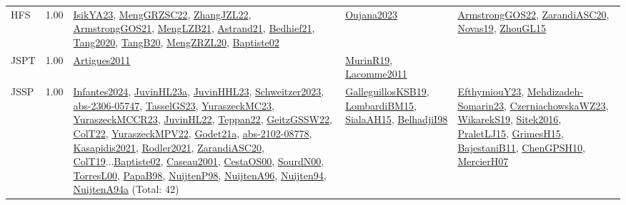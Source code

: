 {\begin{longtable}{p{3cm}r>{\raggedright\arraybackslash}p{6cm}>{\raggedright\arraybackslash}p{6cm}>{\raggedright\arraybackslash}p{8cm}}
\index{HFS}\index{Classification!HFS}HFS &  1.00 & \hyperref[detail:IsikYA23]{IsikYA23}, \hyperref[detail:MengGRZSC22]{MengGRZSC22}, \hyperref[detail:ZhangJZL22]{ZhangJZL22}, \hyperref[detail:ArmstrongGOS21]{ArmstrongGOS21}, \hyperref[detail:MengLZB21]{MengLZB21}, \hyperref[detail:Astrand21]{Astrand21}, \hyperref[detail:Bedhief21]{Bedhief21}, \hyperref[detail:Tang2020]{Tang2020}, \hyperref[detail:TangB20]{TangB20}, \hyperref[detail:MengZRZL20]{MengZRZL20}, \hyperref[detail:Baptiste02]{Baptiste02} & \hyperref[detail:Oujana2023]{Oujana2023} & \hyperref[detail:ArmstrongGOS22]{ArmstrongGOS22}, \hyperref[detail:ZarandiASC20]{ZarandiASC20}, \hyperref[detail:Novas19]{Novas19}, \hyperref[detail:ZhouGL15]{ZhouGL15}\\
\index{JSPT}\index{Classification!JSPT}JSPT &  1.00 & \hyperref[detail:Artigues2011]{Artigues2011} & \hyperref[detail:MurinR19]{MurinR19}, \hyperref[detail:Lacomme2011]{Lacomme2011} & \\
\index{JSSP}\index{Classification!JSSP}JSSP &  1.00 & \hyperref[detail:Infantes2024]{Infantes2024}, \hyperref[detail:JuvinHL23a]{JuvinHL23a}, \hyperref[detail:JuvinHHL23]{JuvinHHL23}, \hyperref[detail:Schweitzer2023]{Schweitzer2023}, \hyperref[detail:abs-2306-05747]{abs-2306-05747}, \hyperref[detail:TasselGS23]{TasselGS23}, \hyperref[detail:YuraszeckMC23]{YuraszeckMC23}, \hyperref[detail:YuraszeckMCCR23]{YuraszeckMCCR23}, \hyperref[detail:JuvinHL22]{JuvinHL22}, \hyperref[detail:Teppan22]{Teppan22}, \hyperref[detail:GeitzGSSW22]{GeitzGSSW22}, \hyperref[detail:ColT22]{ColT22}, \hyperref[detail:YuraszeckMPV22]{YuraszeckMPV22}, \hyperref[detail:Godet21a]{Godet21a}, \hyperref[detail:abs-2102-08778]{abs-2102-08778}, \hyperref[detail:Kasapidis2021]{Kasapidis2021}, \hyperref[detail:Rodler2021]{Rodler2021}, \hyperref[detail:ZarandiASC20]{ZarandiASC20}, \hyperref[detail:ColT19]{ColT19}...\hyperref[detail:Baptiste02]{Baptiste02}, \hyperref[detail:Caseau2001]{Caseau2001}, \hyperref[detail:CestaOS00]{CestaOS00}, \hyperref[detail:SourdN00]{SourdN00}, \hyperref[detail:TorresL00]{TorresL00}, \hyperref[detail:PapaB98]{PapaB98}, \hyperref[detail:NuijtenP98]{NuijtenP98}, \hyperref[detail:NuijtenA96]{NuijtenA96}, \hyperref[detail:Nuijten94]{Nuijten94}, \hyperref[detail:NuijtenA94a]{NuijtenA94a} (Total: 42) & \hyperref[detail:GalleguillosKSB19]{GalleguillosKSB19}, \hyperref[detail:LombardiBM15]{LombardiBM15}, \hyperref[detail:SialaAH15]{SialaAH15}, \hyperref[detail:BelhadjiI98]{BelhadjiI98} & \hyperref[detail:EfthymiouY23]{EfthymiouY23}, \hyperref[detail:Mehdizadeh-Somarin23]{Mehdizadeh-Somarin23}, \hyperref[detail:CzerniachowskaWZ23]{CzerniachowskaWZ23}, \hyperref[detail:WikarekS19]{WikarekS19}, \hyperref[detail:Sitek2016]{Sitek2016}, \hyperref[detail:PraletLJ15]{PraletLJ15}, \hyperref[detail:GrimesH15]{GrimesH15}, \hyperref[detail:BajestaniB11]{BajestaniB11}, \hyperref[detail:ChenGPSH10]{ChenGPSH10}, \hyperref[detail:MercierH07]{MercierH07}\\

\end{longtable}}
